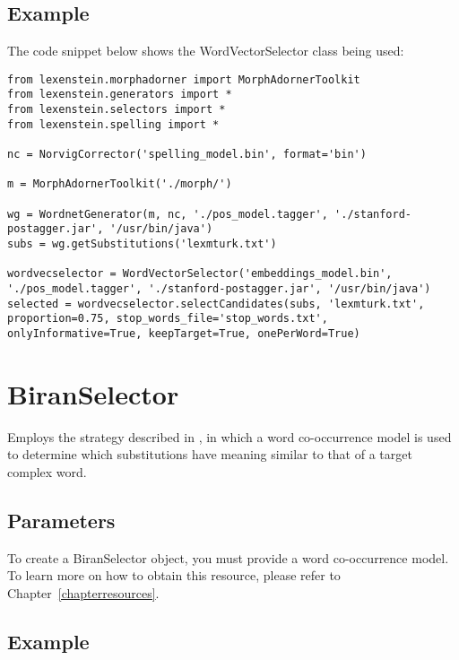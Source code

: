 \subsection{Example}

The code snippet below shows the WordVectorSelector class being used:

\begin{lstlisting}
from lexenstein.morphadorner import MorphAdornerToolkit
from lexenstein.generators import *
from lexenstein.selectors import *
from lexenstein.spelling import *

nc = NorvigCorrector('spelling_model.bin', format='bin')

m = MorphAdornerToolkit('./morph/')

wg = WordnetGenerator(m, nc, './pos_model.tagger', './stanford-postagger.jar', '/usr/bin/java')
subs = wg.getSubstitutions('lexmturk.txt')

wordvecselector = WordVectorSelector('embeddings_model.bin', './pos_model.tagger', './stanford-postagger.jar', '/usr/bin/java')
selected = wordvecselector.selectCandidates(subs, 'lexmturk.txt', proportion=0.75, stop_words_file='stop_words.txt', onlyInformative=True, keepTarget=True, onePerWord=True)
\end{lstlisting}









\section{BiranSelector}

Employs the strategy described in \cite{Biran2011}, in which a word co-occurrence model is used to determine which substitutions have meaning similar to that of a target complex word.


\subsection{Parameters}

To create a BiranSelector object, you must provide a word co-occurrence model. To learn more on how to obtain this resource, please refer to Chapter~\ref{chapterresources}.

\subsection{Example}

